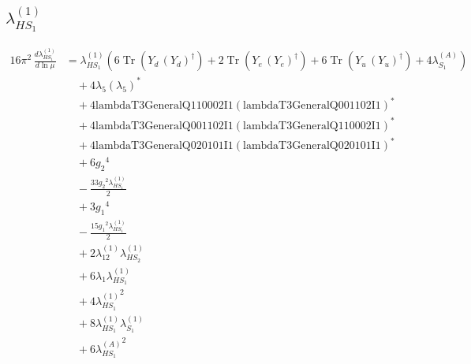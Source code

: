 \documentclass[10pt,a4paper]{article}
\begin{document}
\subsection*{$\lambda_{HS_1}^{(1)}$}
\begin{align*}
16\pi^2\,\frac{d \lambda_{HS_1}^{(1)}}{d\ln\mu} &={\lambda_{HS_1}^{(1)}} (6 \operatorname{Tr}\!\left({Y_d}\,\left({Y_d}\right)^{\dagger}\right)+2 \operatorname{Tr}\!\left({Y_e}\,\left({Y_e}\right)^{\dagger}\right)+6 \operatorname{Tr}\!\left({Y_u}\,\left({Y_u}\right)^{\dagger}\right)+4 {\lambda_{S_1}^{(A)}}) \\
&\quad +4 {\lambda_5} \left({\lambda_5}\right)^{*} \\
&\quad +4 \text{lambdaT3GeneralQ110002I1} \left(\text{lambdaT3GeneralQ001102I1}\right)^{*} \\
&\quad +4 \text{lambdaT3GeneralQ001102I1} \left(\text{lambdaT3GeneralQ110002I1}\right)^{*} \\
&\quad +4 \text{lambdaT3GeneralQ020101I1} \left(\text{lambdaT3GeneralQ020101I1}\right)^{*} \\
&\quad +6 {g_2}^4 \\
&\quad -\frac{33 {g_2}^2 {\lambda_{HS_1}^{(1)}}}{2} \\
&\quad +3 {g_1}^4 \\
&\quad -\frac{15 {g_1}^2 {\lambda_{HS_1}^{(1)}}}{2} \\
&\quad +2 {\lambda_{12}^{(1)}} {\lambda_{HS_2}^{(1)}} \\
&\quad +6 {\lambda_1} {\lambda_{HS_1}^{(1)}} \\
&\quad +4 {\lambda_{HS_1}^{(1)}}^2 \\
&\quad +8 {\lambda_{HS_1}^{(1)}} {\lambda_{S_1}^{(1)}} \\
&\quad +6 {\lambda_{HS_1}^{(A)}}^2 \\
\end{align*}
\end{document}
